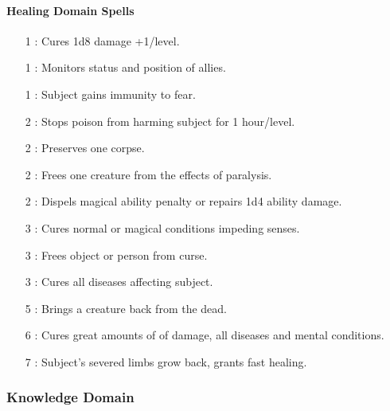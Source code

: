 \paragraph{Healing Domain Spells}
\begin{itemize}
\item[1] : Cures 1d8 damage +1/level.
\item[1] : Monitors status and position of allies.
\item[1] : Subject gains immunity to fear.
\item[2] : Stops poison from harming subject for 1 hour/level.
\item[2] : Preserves one corpse.
\item[2] : Frees one creature from the effects of paralysis.
\item[2] : Dispels magical ability penalty or repairs 1d4 ability damage.
\item[3] : Cures normal or magical conditions impeding senses.
\item[3] : Frees object or person from curse.
\item[3] : Cures all diseases affecting subject.
\item[5] : Brings a creature back from the dead.
\item[6] : Cures great amounts of of damage, all diseases and mental conditions.
\item[7] : Subject's severed limbs grow back, grants fast healing.
\end{itemize}
\subsubsection{Knowledge Domain}
\label{Domain:Knowledge}
